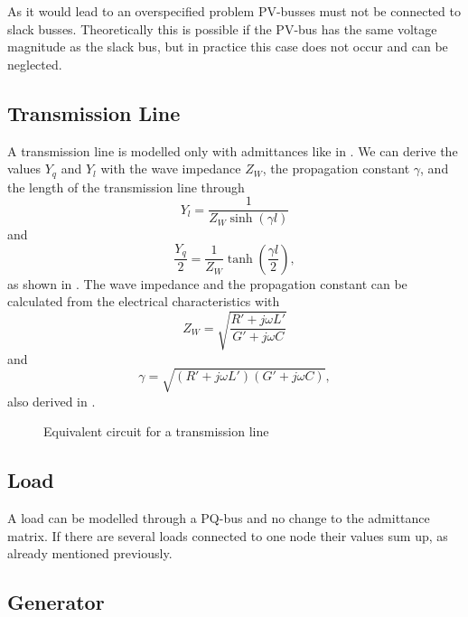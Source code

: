 As it would lead to an overspecified problem PV-busses must not be connected to slack busses. Theoretically this is possible if the PV-bus has the same voltage magnitude as the slack bus, but in practice this case does not occur and can be neglected.

\subsection{Transmission Line}
A transmission line is modelled only with admittances like in . We can derive the values $Y_q$ and $Y_l$ with the wave impedance $Z_W$, the propagation constant $\gamma$, and the length of the transmission line through
\begin{equation}
	Y_l = \frac{1}{Z_W \sinh \left( \gamma l \right)}
\end{equation}
and
\begin{equation}
	\frac{Y_q}{2} = \frac{1}{Z_W} \tanh \left( \frac{\gamma l}{2} \right),
\end{equation}
as shown in \citep[p. 155]{powerSystemAnalysis}. The wave impedance and the propagation constant can be calculated from the electrical characteristics with
\begin{equation}
	Z_W = \sqrt{\frac{R' + j \omega L'}{G' + j \omega C}}
\end{equation}
and 
\begin{equation}
	\gamma = \sqrt{\left( R' + j \omega L' \right) \left( G' + j \omega C \right)},
\end{equation}
also derived in \citep[p. 153]{powerSystemAnalysis}.

\begin{figure}
	\centering
	
	\caption{Equivalent circuit for a transmission line}
	\label{fig:transmission_line}
\end{figure}

\subsection{Load}
A load can be modelled through a PQ-bus and no change to the admittance matrix. If there are several loads connected to one node their values sum up, as already mentioned previously.

\subsection{Generator}

